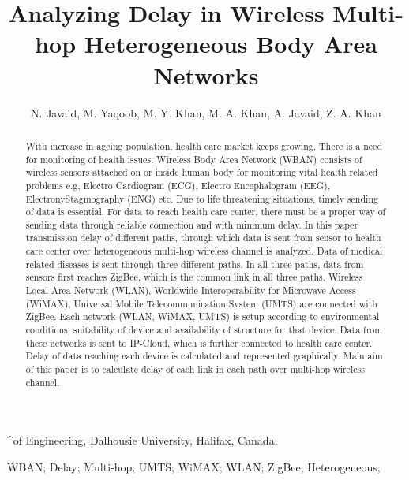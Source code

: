 \documentclass[11pt, conference, compsocconf, onecolumn]{IEEEtran}
\begin{document}
\title{Analyzing Delay in Wireless Multi-hop Heterogeneous Body Area Networks}

\author{N. Javaid, M. Yaqoob, M. Y. Khan, M. A. Khan, A. Javaid, Z. A. Khan}^{\Faculty of Engineering, Dalhousie University, Halifax, Canada.\\
     }

\maketitle

\begin{abstract}
With increase in ageing population, health care market keeps growing. There is a need for monitoring of health issues. Wireless Body Area Network (WBAN) consists of wireless sensors attached on or inside human body for monitoring vital health related problems e.g, Electro Cardiogram (ECG), Electro Encephalogram (EEG), ElectronyStagmography (ENG) etc. Due to life threatening  situations, timely sending of data is essential. For data to reach health care center, there must be a proper way of sending data through reliable connection and with minimum delay. In this paper transmission delay of different paths, through which data is sent from sensor to health care center over heterogeneous multi-hop wireless channel is analyzed. Data of medical related diseases is sent through three different paths. In all three paths, data from sensors first reaches ZigBee, which is the common link in all three paths. Wireless Local Area Network (WLAN), Worldwide Interoperability for Microwave Access (WiMAX), Universal Mobile Telecommunication System (UMTS) are connected with ZigBee. Each network (WLAN, WiMAX, UMTS) is setup according to environmental conditions, suitability of device and availability of structure for that device. Data from these networks is sent to IP-Cloud, which is further connected to health care center. Delay of data reaching each device is calculated and represented graphically. Main aim of this paper is to calculate delay of each link in each path over multi-hop wireless channel.
\end{abstract}
\begin{IEEEkeywords}

WBAN; Delay; Multi-hop; UMTS; WiMAX; WLAN; ZigBee; Heterogeneous;

\end{IEEEkeywords}
\end{document}
